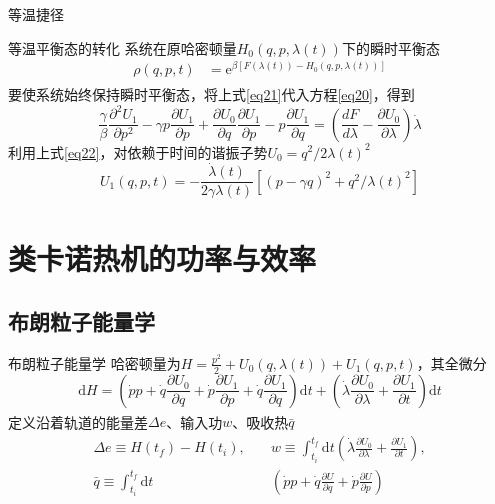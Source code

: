 \documentclass{beamer}
\newcommand{\upcite}[1]{\textsuperscript{\cite{#1}}}  %
\newcommand{\M}[1]{\mathrm{#1}}
\newcommand{\PP}[2]{\frac{\partial #1}{\partial #2}}
\begin{document}
\begin{frame}{等温捷径}
\begin{alertblock}{等温平衡态的转化}
系统在原哈密顿量$H_{0}(q, p, \lambda(t))$下的瞬时平衡态
\begin{equation}
    \begin{split}
        \rho(q, p, t) &= \mathrm{e}^{\beta\left[F(\lambda(t))-H_{0}(q, p, \lambda(t))\right]}
    \end{split}
    \label{eq21}
\end{equation}
\pause
要使系统始终保持瞬时平衡态，将上式\eqref{eq21}代入方程\eqref{eq20}，得到\upcite{Li2016}
\begin{equation}
    \frac{\gamma}{\beta} \frac{\partial^{2} U_{1}}{\partial p^{2}}-\gamma p \frac{\partial U_{1}}{\partial p}+\frac{\partial U_{0}}{\partial q} \frac{\partial U_{1}}{\partial p}-p \frac{\partial U_{1}}{\partial q}=\left(\frac{d F}{d \lambda}-\frac{\partial U_{0}}{\partial \lambda}\right) \dot{\lambda}
    \label{eq22}
\end{equation}
\pause
利用上式\eqref{eq22}，对依赖于时间的谐振子势$U_0 = q^{2} / 2 \lambda(t)^2$
\begin{equation}
    U_{1}(q, p, t)=-\frac{\dot{\lambda}(t)}{2 \gamma \lambda(t)}\left[(p-\gamma q)^{2}+ q^{2}/\lambda(t)^2\right]
    \label{eq2.62}
\end{equation}
\end{alertblock}
\end{frame} 

\section{类卡诺热机的功率与效率}
\subsection{布朗粒子能量学}
\begin{frame}{布朗粒子能量学}
\pause
哈密顿量为$H=\frac{p^{2}}{2}+U_0 (q,\lambda(t)) + U_1 (q,p,t)$，其全微分
\begin{equation}
    \M{d} H=\left(\dot{p} p+\dot{q} \frac{\partial U_0}{\partial q} +  \dot{p} \PP{U_1}{p} + \dot{q} \PP{U_1}{q}  \right) \M{d} t+\left(\dot{\lambda} \frac{\partial U_0}{\partial \lambda} + \PP{U_1}{t} \right) \M{d} t
    \label{eq31.2}
\end{equation}
\pause
定义沿着轨道的能量差$\Delta e$\upcite{Tu2013}、输入功$w$\upcite{Sekimoto2010,Jarzynski1997,Sekimoto_1997}、吸收热$\bar{q}$
\begin{equation}
\begin{split}
    \Delta e \equiv H\left(t_{f}\right)-H\left(t_{i}\right),\quad &
    w \equiv \int_{t_{i}}^{t_{f}} \M{d} t \left( \dot{\lambda} \frac{\partial U_0}{\partial \lambda} + \PP{U_1}{t} \right),\\
    \bar{q}\equiv \int_{t_{i}}^{t_{f}}  \M{d} t & \left(\dot{p} p+\dot{q} \frac{\partial U}{\partial q} +  \dot{p} \PP{U}{p}\right)
    \label{eq31.5}
\end{split}
\end{equation}
\end{frame}
\end{document}
